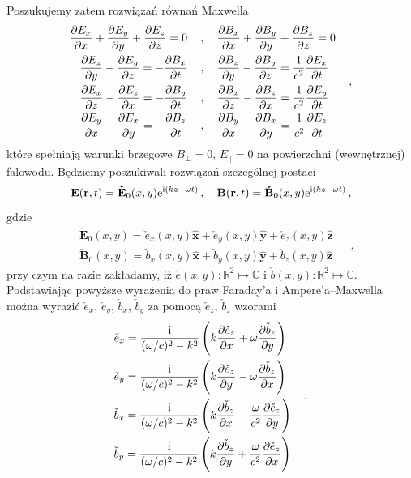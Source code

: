 \documentclass[../main.tex]{subfiles}
\begin{document}
Poszukujemy zatem rozwiązań równań Maxwella
\begin{equation*}
    \begin{split}
        \pdv{E_x}{x}+\pdv{E_y}{y}+\pdv{E_z}{z}=0\quad&\,,\quad \pdv{B_x}{x}+\pdv{B_y}{y}+\pdv{B_z}{z}=0\\
        \pdv{E_z}{y}-\pdv{E_y}{z}=-\pdv{B_x}{t}\quad&\,, \quad \pdv{B_z}{y}-\pdv{B_y}{z}=\frac{1}{c^2}\pdv{E_x}{t}\\
        \pdv{E_x}{z}-\pdv{E_z}{x}=-\pdv{B_y}{t}\quad&\,, \quad \pdv{B_x}{z}-\pdv{B_z}{x}=\frac{1}{c^2}\pdv{E_y}{t}\\
        \pdv{E_y}{x}-\pdv{E_x}{y}=-\pdv{B_z}{t}\quad&\,, \quad \pdv{B_y}{x}-\pdv{B_x}{y}=\frac{1}{c^2}\pdv{E_z}{t}
    \end{split}\quad\,,
\end{equation*}
które spełniają warunki brzegowe \(B_\perp=0\), \(E_\parallel=0\) na powierzchni (wewnętrznej) falowodu. Będziemy poszukiwali rozwiązań szczególnej postaci
\begin{equation*}
    \mathbf{E}(\mathbf{r},t)=\mathbf{\check E}_0(x,y)\mathrm{e}^{\mathrm{i}(kz-\omega t)}\,,\quad \mathbf{B}(\mathbf{r},t)=\mathbf{\check B}_0(x,y)\mathrm{e}^{\mathrm{i}(kz-\omega t)}\,,
\end{equation*}
gdzie
\begin{equation*}
    \begin{split}
        &\mathbf{\check E}_0(x,y)=\check e_x(x,y)\mathbf{\hat{x}}+\check e_y(x,y)\mathbf{\hat{y}}+\check e_z(x,y)\mathbf{\hat{z}}\\
        &\mathbf{\check B}_0(x,y)=\check b_x(x,y)\mathbf{\hat{x}}+\check b_y(x,y)\mathbf{\hat{y}}+\check b_z(x,y)\mathbf{\hat{z}}
    \end{split}\quad\,,
\end{equation*}
przy czym na razie zakładamy, iż \(\check e(x,y):\mathbb{R}^2\mapsto\mathbb{C}\) i \(\check b(x,y):\mathbb{R}^2\mapsto\mathbb{C}\). Podstawiając powyższe wyrażenia do praw Faraday'a i Ampere'a--Maxwella można wyrazić \(\check e_x\), \(\check e_y\), \(\check b_x\), \(\check b_y\) za pomocą \(\check e_z\), \(\check b_z\) wzorami
\begin{equation*}
    \begin{split}
        &\check e_x=\frac{\mathrm{i}}{(\omega/c)^2-k^2}\left(k\pdv{\check e_z}{x}+\omega\pdv{\check b_z}{y}\right)\\
        &\check e_y=\frac{\mathrm{i}}{(\omega/c)^2-k^2}\left(k\pdv{\check e_z}{y}-\omega\pdv{\check b_z}{x}\right)\\
        &\check b_x=\frac{\mathrm{i}}{(\omega/c)^2-k^2}\left(k\pdv{\check b_z}{x}-\frac{\omega}{c^2}\pdv{\check e_z}{y}\right)\\
        &\check b_y=\frac{\mathrm{i}}{(\omega/c)^2-k^2}\left(k\pdv{\check b_z}{y}+\frac{\omega}{c^2}\pdv{\check e_z}{x}\right)\\
    \end{split}\quad\,,
\end{equation*}
\end{document}
